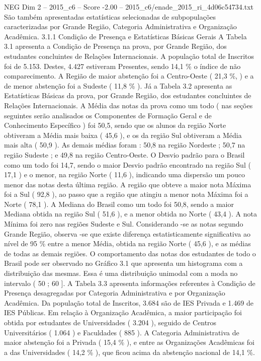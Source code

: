 \begin{textsample}{NEG Dim 2 – 2015\_c6 – Score -2.00 – 2015\_c6/enade\_2015\_ri\_4d06c54734.txt}
São também apresentadas estatísticas selecionadas de subpopulações caracterizadas por Grande Região, Categoria Administrativa e Organização Acadêmica. 3.1.1 Condição de Presença e Estatísticas Básicas Gerais A Tabela 3.1 apresenta a Condição de Presença na prova, por Grande Região, dos estudantes concluintes de Relações Internacionais.
A população total de Inscritos foi de 5.153.
Destes, 4.427 estiveram Presentes, sendo 14,1 \% o índice de não comparecimento.
A Região de maior abstenção foi a Centro-Oeste ( 21,3 \%, ) e a de menor abstenção foi a Sudeste ( 11,8 \% ).
Já a Tabela 3.2 apresenta as Estatísticas Básicas da prova, por Grande Região, dos estudantes concluintes de Relações Internacionais.
A Média das notas da prova como um todo ( nas seções seguintes serão analisados os Componentes de Formação Geral e de Conhecimento Específico ) foi 50,5, sendo que os alunos da região Norte obtiveram a Média mais baixa ( 45,6 ), e os da região Sul obtiveram a Média mais alta ( 50,9 ).
As demais médias foram : 50,8 na região Nordeste ; 50,7 na região Sudeste ; e 49,8 na região Centro-Oeste.
O Desvio padrão para o Brasil como um todo foi 14,7, sendo o maior Desvio padrão encontrado na região Sul ( 17,1 ) e o menor, na região Norte ( 11,6 ), indicando uma dispersão um pouco menor das notas desta última região.
A região que obteve a maior nota Máxima foi a Sul ( 92,8 ), ao passo que a região que atingiu a menor nota Máxima foi a Norte ( 78,1 ).
A Mediana do Brasil como um todo foi 50,8, sendo a maior Mediana obtida na região Sul ( 51,6 ), e a menor obtida no Norte ( 43,4 ).
A nota Mínima foi zero nas regiões Sudeste e Sul.
Considerando -se as notas segundo Grande Região, observa -se que existe diferença estatisticamente significativa ao nível de 95 \% entre a menor Média, obtida na região Norte ( 45,6 ), e as médias de todas as demais regiões.
O comportamento das notas dos estudantes de todo o Brasil pode ser observado no Gráfico 3.1 que apresenta um histograma com a distribuição das mesmas.
Essa é uma distribuição unimodal com a moda no intervalo ( 50 ; 60 ].
A Tabela 3.3 apresenta informações referentes à Condição de Presença desagregadas por Categoria Administrativa e por Organização Acadêmica.
Da população total de Inscritos, 3.684 são de IES Privada e 1.469 de IES Públicas.
Em relação à Organização Acadêmica, a maior participação foi obtida por estudantes de Universidades ( 3.204 ), seguido de Centros Universitários ( 1.064 ) e Faculdades ( 885 ).
A Categoria Administrativa de maior abstenção foi a Privada ( 15,4 \% ), e entre as Organizações Acadêmicas foi a das Universidades ( 14,2 \% ), que ficou acima da abstenção nacional de 14,1 \%.

\end{textsample}
